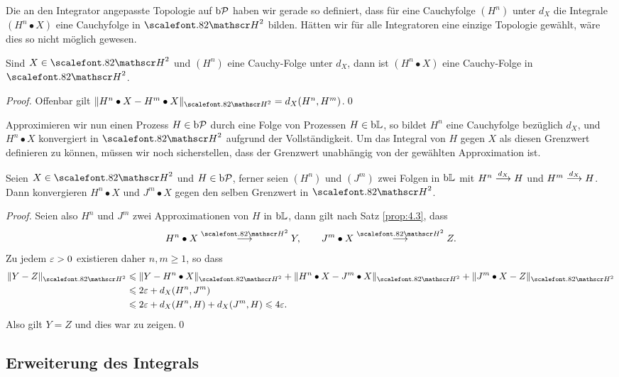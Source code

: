 Die an den Integrator angepasste Topologie auf $\mathrm{b}\mathcal{P}$ haben wir gerade so
definiert, dass für eine Cauchyfolge $(H^n)$ unter $d_X$ die Integrale
$(H^n\bullet X)$ eine Cauchyfolge in $\cH^2$ bilden. Hätten wir für alle
Integratoren eine einzige Topologie gewählt, wäre dies so nicht möglich
gewesen.

\begin{theorem}
\label{prop:4.3}
Sind $X \in \cH^2$ und $(H^n)$ eine Cauchy-Folge unter $d_X$,
dann ist $(H^n \bullet X)$ eine Cauchy-Folge in $\cH^2$.\fish
\end{theorem}
\begin{proof}
Offenbar gilt $\norm{H^n\bullet X-H^m\bullet X}_{\cH^2} = d_X(H^n,H^m)$.\qed
\end{proof}

Approximieren wir nun einen Prozess $H\in\mathrm{b}\mathcal{P}$ durch eine Folge von Prozessen
$H\in\mathrm{b}\mathbb{L}$, so bildet $H^n$ eine Cauchyfolge bezüglich $d_X$, und
$H^n\bullet X$ konvergiert in $\cH^2$ aufgrund der Vollständigkeit. Um
das Integral von $H$ gegen $X$ als diesen Grenzwert definieren zu können, müssen
wir noch sicherstellen, dass der Grenzwert unabhängig von der gewählten
Approximation ist. 

\begin{theorem}
\label{prop:4.4}
Seien $X \in \cH^2$ und $H\in \mathrm{b}\mathcal{P}$, ferner seien $(H^n)$ und
  $(J^m)$ zwei Folgen in $\mathrm{b}\mathbb{L}$ mit $H^n \overset{d_X}{\longrightarrow} H$ und  $H^m
  \overset{d_X}{\longrightarrow} H$. Dann konvergieren $H^n\bullet X$ und $J^m\bullet X$
  gegen den selben Grenzwert in $\cH^2$.\fish
\end{theorem}
\begin{proof}
Seien also $H^n$ und $J^m$ zwei Approximationen von $H$ in $\mathrm{b}\mathbb{L}$, dann gilt nach
Satz \ref{prop:4.3}, dass
\begin{align*}
H^n\bullet X \Hto Y,\qquad J^m\bullet X \Hto Z.
\end{align*}
Zu jedem $\varepsilon > 0$ existieren daher $n,m\ge 1$, so dass
\begin{align*}
\norm{Y-Z}_{\HH^2} &\le \norm{Y-H^n\bullet X}_{\HH^2} + \norm{H^n\bullet
X-J^m\bullet X}_{\HH^2} + \norm{J^m\bullet X-Z}_{\HH^2}\\
&\le 2 \ep + d_X(H^n,J^m)\\
&\le 2\ep + d_X(H^n,H) + d_X(J^m,H)
\le 4\ep.
\end{align*}
Also gilt $Y=Z$ und dies war zu zeigen.\qed
\end{proof}

\subsection{Erweiterung des Integrals}

